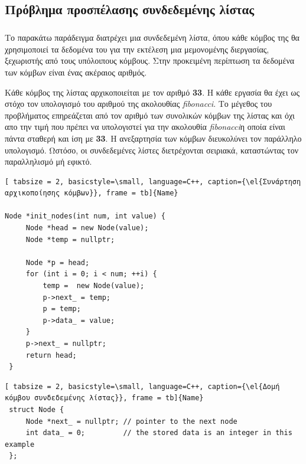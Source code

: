 \documentclass[12pt]{article}
\newcommand{\en}[1]{\foreignlanguage{english}{#1}}
\newcommand{\el}[1]{\selectlanguage{greek}{#1}\selectlanguage{english}}
\begin{document}
\subsection{Πρόβλημα προσπέλασης συνδεδεμένης λίστας}
\subparagraph{}
Το παρακάτω παράδειγμα διατρέχει μια συνδεδεμένη λίστα, όπου κάθε κόμβος της θα χρησιμοποιεί τα δεδομένα του για την εκτέλεση μια μεμονομένης διεργασίας, ξεχωριστής από τους υπόλοιπους κόμβους. Στην προκειμένη περίπτωση τα δεδομένα των κόμβων είναι ένας ακέραιος αριθμός.


Κάθε κόμβος της λίστας αρχικοποιείται με τον αριθμό \textbf{33}. Η κάθε εργασία θα έχει ως στόχο τον υπολογισμό του αριθμού της ακολουθίας \emph{\en{fibonacci}}.
Το μέγεθος του προβλήματος επηρεάζεται από τον αριθμό των συνολικών κόμβων της λίστας και όχι απο την τιμή που πρέπει να υπολογιστεί για την ακολουθία \emph{fibonacci}η οποία είναι πάντα σταθερή και ίση με \textbf{33}.
Η ανεξαρτησία των κόμβων διευκολύνει τον παράλληλο υπολογισμό. Ωστόσο, οι συνδεδεμένες λίστες διετρέχονται σειριακά, καταστώντας τον παραλληλισμό μή εφικτό.
\ \\
\begin{center}

\begin{lstlisting}[ tabsize = 2, basicstyle=\small, language=C++, caption={\el{Συνάρτηση αρχικοποίησης κόμβων}}, frame = tb]{Name}
		
Node *init_nodes(int num, int value) {
     Node *head = new Node(value);
     Node *temp = nullptr;
 
     Node *p = head;
     for (int i = 0; i < num; ++i) {
         temp =  new Node(value);
         p->next_ = temp;
         p = temp;
         p->data_ = value;
     }
     p->next_ = nullptr;
     return head;
 }
\end{lstlisting}
\end{center}
\clearpage
{}
\begin{lstlisting}[ tabsize = 2, basicstyle=\small, language=C++, caption={\el{Δομή κόμβου συνδεδεμένης λίστας}}, frame = tb]{Name}
 struct Node {
     Node *next_ = nullptr; // pointer to the next node
     int data_ = 0;         // the stored data is an integer in this example
 };
\end{lstlisting}
\end{document}
